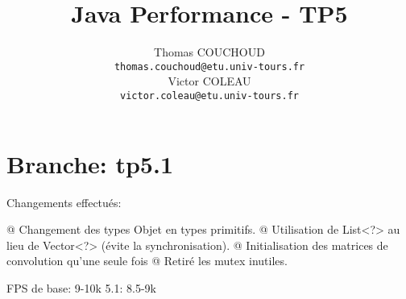 \documentclass{report}
\title{Java Performance - TP5}
\author{Thomas COUCHOUD\\\texttt{thomas.couchoud@etu.univ-tours.fr}\\Victor COLEAU\\\texttt{victor.coleau@etu.univ-tours.fr}}
\begin{document}
	\mccTitle
	
	\chapter{Branche: tp5.1}
		Changements effectués:
		\begin{easylist}[itemize]
			@ Changement des types Objet en types primitifs.
			@ Utilisation de List<?> au lieu de Vector<?> (évite la synchronisation).
			@ Initialisation des matrices de convolution qu'une seule fois
			@ Retiré les mutex inutiles.
		\end{easylist}
		
		FPS de base: 9-10k
		5.1: 8.5-9k
\end{document}
